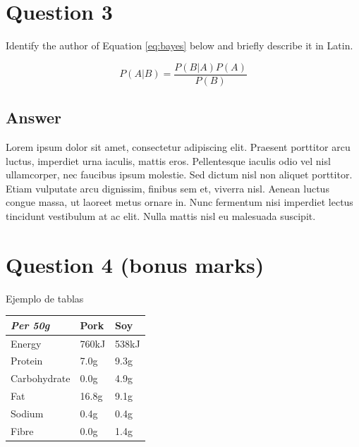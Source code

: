 \documentclass[
	12pt, %
	spanish, %
]{fphw}
\begin{document}

\section*{Question 3}

\begin{problem}
	Identify the author of Equation \ref{eq:bayes} below and briefly describe it in Latin.
	
	\medskip
	
	\begin{equation}\label{eq:bayes}
		P(A|B) = \frac{P(B|A)P(A)}{P(B)}
	\end{equation}
	
	\smallskip
\end{problem}


\subsection*{Answer} 

Lorem ipsum dolor sit amet, consectetur adipiscing elit. Praesent porttitor arcu luctus, imperdiet urna iaculis, mattis eros. Pellentesque iaculis odio vel nisl ullamcorper, nec faucibus ipsum molestie. Sed dictum nisl non aliquet porttitor. Etiam vulputate arcu dignissim, finibus sem et, viverra nisl. Aenean luctus congue massa, ut laoreet metus ornare in. Nunc fermentum nisi imperdiet lectus tincidunt vestibulum at ac elit. Nulla mattis nisl eu malesuada suscipit.


\section*{Question 4 (bonus marks)}

\begin{problem}
    Ejemplo de tablas
	
	\bigskip
    
	\begin{center}
		\begin{tabular}{l l l}
			\toprule
			\textit{Per 50g} & Pork & Soy \\
			\midrule
			Energy & 760kJ & 538kJ\\
			Protein & 7.0g & 9.3g\\
			Carbohydrate & 0.0g & 4.9g\\
			Fat & 16.8g & 9.1g\\
			Sodium & 0.4g & 0.4g\\
			Fibre & 0.0g & 1.4g\\
			\bottomrule
		\end{tabular}
	\end{center}
	\medskip
\end{problem}
\end{document}
